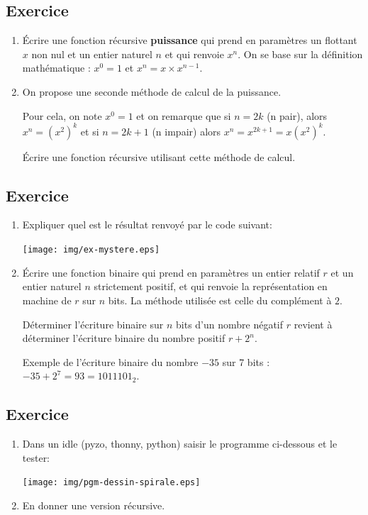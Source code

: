 \documentclass[11pt,a4paper]{article}
\newcounter{numexo}
\begin{document}
\subsection*{\Large Exercice \thenumexo}
\begin{enumerate}
\item Écrire une fonction récursive \textbf{puissance} qui prend en paramètres un flottant $x$ non nul et un entier naturel $n$ et qui renvoie $x^{n}$. On se base sur la définition mathématique : $x^{0}=1$ et $x^{n}=x \times x^{n-1}$.
\item On propose une seconde méthode de calcul de la puissance. 

Pour cela, on note $x^{0}=1$ et on remarque que si $n=2k$ (n pair), alors $x^{n}=(x^{2})^{k}$ et si $n=2k+1$ (n impair) alors $x^{n}=x^{2k+1}=x(x^{2})^{k}$.

Écrire une fonction récursive utilisant cette méthode de calcul.
\end{enumerate}


\addtocounter{numexo}{1}
\subsection*{\Large Exercice \thenumexo}
\begin{enumerate}
\item Expliquer quel est le résultat renvoyé par le code suivant:
\begin{center}
\texttt{[image: img/ex-mystere.eps]}
\end{center}
\item Écrire une fonction binaire qui prend en paramètres un entier relatif $r$ et un entier naturel $n$ strictement positif, et qui renvoie la représentation en machine de $r$ sur $n$ bits. La méthode utilisée est celle du complément à $2$.

Déterminer l'écriture binaire sur $n$ bits d'un nombre négatif $r$ revient à déterminer l'écriture binaire du nombre positif  $r+2^{n}$.

Exemple de l'écriture binaire du nombre $-35$ sur 7 bits : $-35+2^{7}=93=1011101_{2}$.
\end{enumerate}


\addtocounter{numexo}{1}
\subsection*{\Large Exercice \thenumexo}
\begin{enumerate}
\item Dans un idle (pyzo, thonny, python) saisir le programme ci-dessous et le tester:
\begin{center}
\texttt{[image: img/pgm-dessin-spirale.eps]}
\end{center}
\item En donner une version récursive.
\end{enumerate}
\end{document}
